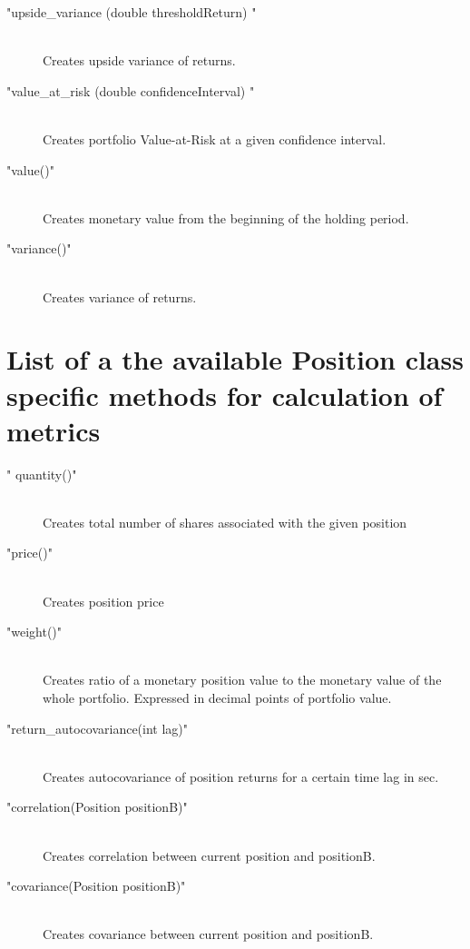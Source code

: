 \documentclass[letterpaper]{report}
\begin{document}
\begin{description}
\item["upside\_variance (double thresholdReturn) "] \hfill \\ 
Creates upside variance of returns.


\item["value\_at\_risk (double confidenceInterval) "] \hfill \\ 
Creates portfolio Value-at-Risk at a given confidence interval.


\item["value()"] \hfill \\ 
Creates monetary value  from the beginning of the holding
 period.


\item["variance()"] \hfill \\ 
Creates variance of  returns.
 \end{description} 
 
 
 \section{List of a the available Position class specific  methods for calculation of metrics}
 
 \begin{description} 
\item[" quantity()"] \hfill \\ 
  Creates total number of shares associated with the given position

\item["price()"] \hfill \\ 
Creates position price


\item["weight()"] \hfill \\ 
Creates ratio of a monetary position value to the monetary value of the
whole portfolio. Expressed in decimal points of portfolio value.

\item["return\_autocovariance(int lag)"] \hfill \\ 
Creates autocovariance of position returns for a certain time lag in sec.


\item["correlation(Position positionB)"] \hfill \\ 
Creates correlation between current position and positionB.


\item["covariance(Position positionB)"] \hfill \\ 
Creates covariance between current position and positionB.

 \end{description} 	
\end{document}
